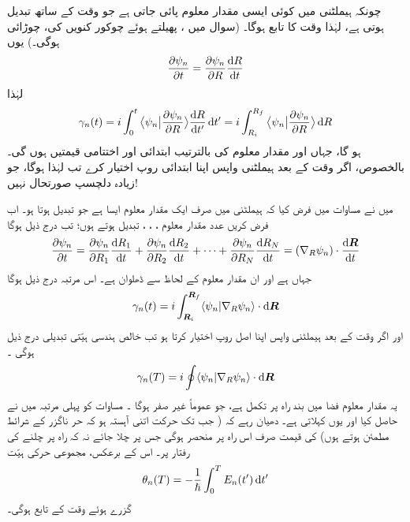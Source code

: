  چونکہ  ہیملٹنی میں کوئی ایسی مقدار معلوم  پائی  جاتی  ہے جو وقت کے ساتھ تبدیل ہوتی  ہے، لہٰذا  وقت  کا تابع ہوگا۔   (سوال    میں  ،  پھیلتے ہوئے چوکور کنویں کی،  چوڑائی  ہوگی۔)  یوں
\begin{align}\label{مساوات_حر_ایک_مقدار_معلوم}
\frac{\partial \psi_n}{\partial t} = \frac{\partial \psi_n}{\partial R} \frac{\dif R}{\dif t}
\end{align}
لہٰذا 
\begin{align}\label{مساوات_حر_ہندسی_ہیّت_فرق}
\gamma_n (t) = i \int_0^t \big\langle \psi_n \big| \frac{\partial \psi_n}{\partial R} \big\rangle \frac{\dif R}{\dif t'} \dif t' = i \int_{R_i}^{R_f} \big\langle \psi_n \big | \frac{\partial \psi_n}{\partial R}\big \rangle \dif R 
\end{align}
ہو گا، جہاں  اور  مقدار معلوم  کی بالترتیب ابتدائی اور اختتامی قیمتیں ہوں گی۔ بالخصوص،  اگر وقت   کے  بعد ہیملٹنی واپس اپنا  ابتدائی روپ اختیار کرے تب  لہٰذا  ہوگا،  جو زیادہ دلچسپ  صورتحال نہیں!

 میں نے مساوات    میں فرض کیا کہ ہیملٹنی میں صرف ایک مقدار معلوم ایسا ہے جو تبدیل ہوتا ہو۔ اب  فرض کریں  عدد مقدار معلوم ،  ، ،  تبدیل ہوتے ہوں؛  تب درج ذیل ہوگا 
\begin{align}
\frac{\partial \psi_n}{\partial t} = \frac{\partial \psi_n}{\partial R_1} \frac{\dif R_1}{\dif t} + \frac{\partial \psi_n}{\partial R_2} \frac{\dif R_2}{\dif t} + \cdots + \frac{\partial \psi_n}{\partial R_N} \frac{\dif R_N}{\dif t} = (\nabla_R \psi_n) \cdot \frac{\dif \kvec{R}}{\dif t}
\end{align} 
جہاں  ہے اور  ان مقدار معلوم کے لحاظ سے ڈھلوان ہے۔  اس مرتبہ درج ذیل ہوگا 
\begin{align}
\gamma_n (t) = i \int_{\kvec{R}_i}^{\kvec{R}_f} \langle \psi_n | \nabla_R \psi_n \rangle \cdot \dif \kvec{R}
\end{align}
اور اگر وقت  کے بعد ہیملٹنی واپس اپنا  اصل روپ اختیار کرتا ہو تب خالص  ہندسی ہیّتی تبدیلی درج ذیل ہوگی ۔
\begin{align}\label{مساوات_حر_غیر_صفر_لکیری_تکمل}
\gamma_n (T) = i \oint \langle \psi_n | \nabla_R \psi_n \rangle \cdot \dif \kvec{R}
\end{align}
یہ مقدار معلوم   فضا میں  بند راہ پر    تکمل ہے، جو عموماً غیر صفر ہوگا ۔ مساوات    کو پہلی مرتبہ    میں     نے حاصل کیا اور یوں    کہلاتی ہے۔ دھیان رہے  کہ ( جب تک  حرکت  اتنی آہستہ ہو کہ  حر ناگزر کے شرائط مطمئن ہوتے ہوں)   کی قیمت صرف اس راہ پر منحصر ہوگی جس پر چلا جائے نہ کہ راہ پر چلنے کی رفتار پر۔  اس کے برعکس،  مجموعی حرکی ہیّت 
\begin{align*}
\theta_n (T) = - \frac{1}{\hslash} \int_0^T E_n (t') \dif t'
\end{align*}
گزرے ہوئے وقت کے  تابع ہوگی۔

